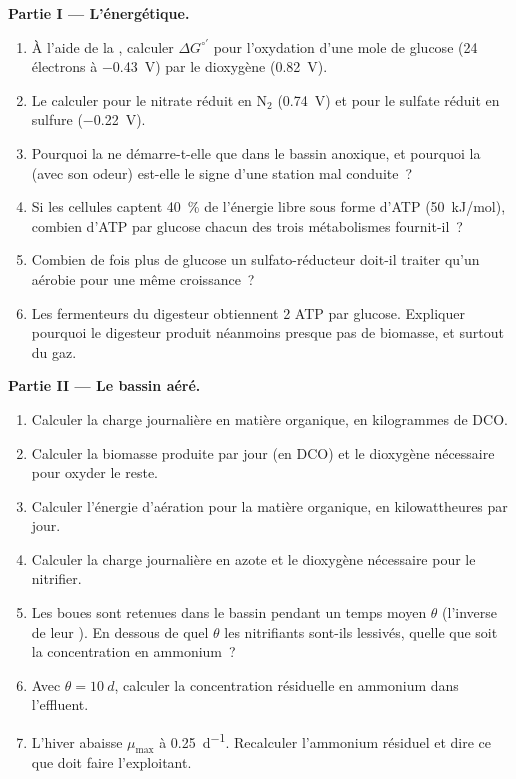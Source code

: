 \begin{problem}
\medskip
\noindent\textbf{Partie I --- L'énergétique.}
\begin{enumerate}
  \item À l'aide de la , calculer $\Delta G^{\circ\prime}$
        pour l'oxydation d'une mole de glucose (24 électrons à
        \qty{-0.43}{V}) par le dioxygène (\qty{+0.82}{V}).
  \item Le calculer pour le nitrate réduit en $\mathrm{N_2}$
        (\qty{+0.74}{V}) et pour le sulfate réduit en sulfure
        (\qty{-0.22}{V}).
  \item Pourquoi la  ne démarre-t-elle que dans le bassin
        anoxique, et pourquoi la  (avec son odeur)
        est-elle le signe d'une station mal conduite~?
  \item Si les cellules captent \qty{40}{\%} de l'énergie libre sous
        forme d'ATP (\qty{50}{kJ/mol}), combien d'ATP par glucose
        chacun des trois métabolismes fournit-il~?
  \item Combien de fois plus de glucose un sulfato-réducteur doit-il
        traiter qu'un aérobie pour une même croissance~?
  \item Les fermenteurs du digesteur obtiennent 2 ATP par glucose.
        Expliquer pourquoi le digesteur produit néanmoins presque pas de
        biomasse, et surtout du gaz.
\end{enumerate}

\medskip
\noindent\textbf{Partie II --- Le bassin aéré.}
\begin{enumerate}[resume]
  \item Calculer la charge journalière en matière organique, en
        kilogrammes de DCO.
  \item Calculer la biomasse produite par jour (en DCO) et le dioxygène
        nécessaire pour oxyder le reste.
  \item Calculer l'énergie d'aération pour la matière organique, en
        kilowattheures par jour.
  \item Calculer la charge journalière en azote et le dioxygène
        nécessaire pour le nitrifier.
  \item Les boues sont retenues dans le bassin pendant un temps moyen
        $\theta$ (l'inverse de leur ). En dessous de quel
        $\theta$ les nitrifiants sont-ils lessivés, quelle que soit la
        concentration en ammonium~?
  \item Avec $\theta = \qty{10}{d}$, calculer la concentration résiduelle
        en ammonium dans l'effluent.
  \item L'hiver abaisse $\mu_{\max}$ à \qty{0.25}{d^{-1}}. Recalculer
        l'ammonium résiduel et dire ce que doit faire l'exploitant.
\end{enumerate}


\end{problem}

